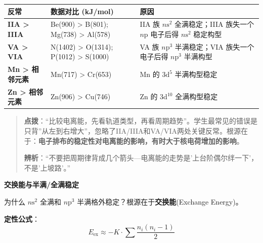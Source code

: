 \documentclass[a4paper,11pt]{ctexart}
\newcounter{none}
\newcommand{\箭}{\ensuremath{\rightarrow}}
\newcommand{\左箭}{\ensuremath{\leftarrow}}
\newcommand{\上箭}{\ensuremath{\uparrow}}
\newcommand{\下箭}{\ensuremath{\downarrow}}
\newcommand{\衡}{\ensuremath{\rightleftharpoons}}
\newcommand{\双箭}{\ensuremath{\leftrightarrow}}
\newcommand{\约等于}{\ensuremath{\approx}}
\newcommand{\小于等于}{\ensuremath{\leq}}
\newcommand{\大于等于}{\ensuremath{\geq}}
\newcommand{\不等于}{\ensuremath{\neq}}
\newcommand{\西格马}{\ensuremath{\sigma}}
\newcommand{\派}{\ensuremath{\pi}}
\begin{document}
{\def\LTcaptype{none} %
\begin{longtable}[]{@{}
  >{\raggedright\arraybackslash}p{}
  >{\raggedright\arraybackslash}p{}
  >{\raggedright\arraybackslash}p{}@{}}
\toprule\noalign{}
\begin{minipage}[b]{\linewidth}\raggedright
反常
\end{minipage} & \begin{minipage}[b]{\linewidth}\raggedright
数据对比 (kJ/mol)
\end{minipage} & \begin{minipage}[b]{\linewidth}\raggedright
原因
\end{minipage} \\
\midrule\noalign{}
\endhead
\bottomrule\noalign{}
\endlastfoot
\textbf{IIA \textgreater{} IIIA} & Be(900) \textgreater{} B(801); Mg(738) \textgreater{} Al(578) & IIA 族 \(n\mathrm{s}^2\) 全满稳定；IIIA 族失一个 \(n\mathrm{p}\) 电子后得 \(n\mathrm{s}^2\) 稳定构型 \\
\textbf{VA \textgreater{} VIA} & N(1402) \textgreater{} O(1314); P(1012) \textgreater{} S(1000) & VA 族 \(n\mathrm{p}^3\) 半满稳定；VIA 族失一个电子后得 \(n\mathrm{p}^3\) 半满构型 \\
\textbf{Mn \textgreater{} 相邻元素} & Mn(717) \textgreater{} Cr(653) & Mn 的 \(3\mathrm{d}^5\) 半满构型稳定 \\
\textbf{Zn \textgreater{} 相邻元素} & Zn(906) \textgreater{} Cu(746) & Zn 的 \(3\mathrm{d}^{10}\) 全满构型稳定 \\
\end{longtable}
}

\begin{quote}
\textbf{点拨}：``比较电离能，先看轨道类型，再看周期趋势''。学生最常见的错误是只背''从左到右增大''，忽略了IIA/IIIA和VA/VIA两处关键反常。根源在于：\textbf{电子排布的稳定性对电离能的影响，有时大于核电荷增加的影响}。

\textbf{辨析}：``不要把周期律背成几个箭头---电离能的走势是'上台阶偶尔绊一下'，不是'上坡路'。''
\end{quote}

\textbf{交换能与半满/全满稳定}

为什么 \(n\mathrm{s}^2\) 全满和 \(n\mathrm{p}^3\) 半满格外稳定？根源在于\textbf{交换能}(Exchange Energy)。

\textbf{定性公式}：
\[E_{\text{ex}} \approx -K \cdot \sum \frac{n_i(n_i-1)}{2}\]
\end{document}
